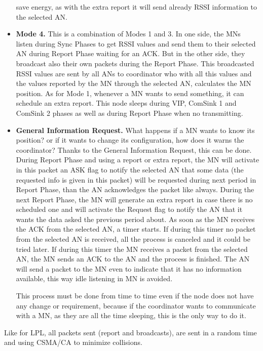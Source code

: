 \begin{itemize}
save energy, as with the extra report it will send already \ac{RSSI} information to the selected \ac{AN}.
 \item \textbf{Mode 4.} This is a combination of Modes 1 and 3. In one side, the \acp{MN} listen during Sync Phases to get \ac{RSSI} values and send them
to their selected \ac{AN} during Report Phase waiting for an \ac{ACK}. But in the other side, they broadcast also their own packets during the Report Phase.
This broadcasted \ac{RSSI} values are sent by all \acp{AN} to coordinator who with all this values and the values reported by the \ac{MN} through the 
selected \ac{AN}, calculates the \ac{MN} position. As for Mode 1, whenever a \ac{MN} wants to send something, it can schedule an extra report. This node sleeps
during \ac{VIP}, ComSink 1 and ComSink 2 phases as well as during Report Phase when no transmitting.
 \item \textbf{General Information Request.} What happens if a \ac{MN} wants to know its position? or if it wants to change its configuration, how does it
warns the coordinator? Thanks to the General Information Request, this can be done. During Report Phase and using a report or extra report, the \ac{MN}
will activate in this packet an ASK flag to notify the selected \ac{AN} that some data (the requested info is given in this packet) will be requested 
during next period in Report Phase, than the \ac{AN} acknowledges the packet like always. During the next Report Phase, the \ac{MN} will generate an extra
report in case there is no scheduled one and will activate the Request flag to notify the \ac{AN} that it wants the data asked the previous period about. As soon
as the \ac{MN} receives the \ac{ACK} from the selected \ac{AN}, a timer starts. If during this timer no packet from the selected \ac{AN} is received, all
the process is canceled and it could be tried later. If during this timer the \ac{MN} receives a packet from the selected \ac{AN}, the \ac{MN} sends an
\ac{ACK} to the \ac{AN} and the process is finished. The \ac{AN} will send a packet to the \ac{MN} even to indicate that it has no information available,
this way idle listening in \ac{MN} is avoided.

This process must be done from time to time even if the node does not have any change or requirement, because if the coordinator wants to communicate with a
\ac{MN}, as they are all the time sleeping, this is the only way to do it.
\end{itemize}

Like for \ac{LPL}, all packets sent (report and broadcasts), are sent in a random time and using \ac{CSMA/CA} to minimize collisions.

